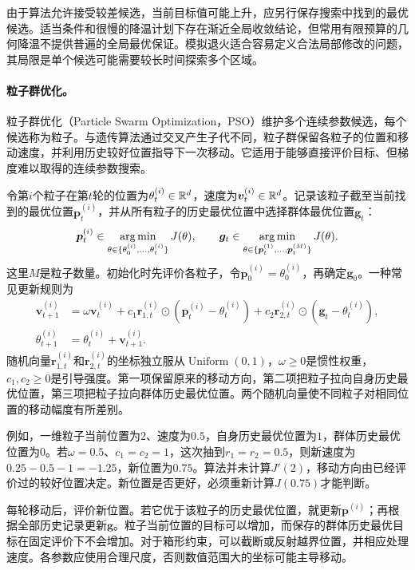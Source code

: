 由于算法允许接受较差候选，当前目标值可能上升，应另行保存搜索中找到的最优候选。适当条件和很慢的降温计划下存在渐近全局收敛结论，但常用有限预算的几何降温不提供普遍的全局最优保证。模拟退火适合容易定义合法局部修改的问题，其局限是单个候选可能需要较长时间探索多个区域。

\paragraph{粒子群优化。}
粒子群优化（Particle Swarm Optimization，PSO）维护多个连续参数候选，每个候选称为粒子。与遗传算法通过交叉产生子代不同，粒子群保留各粒子的位置和移动速度，并利用历史较好位置指导下一次移动。它适用于能够直接评价目标、但梯度难以取得的连续参数搜索。

令第$i$个粒子在第$t$轮的位置为$\theta_t^{(i)}\in\mathbb{R}^d$，速度为$\bm v_t^{(i)}\in\mathbb{R}^d$。记录该粒子截至当前找到的最优位置$\bm p_t^{(i)}$，并从所有粒子的历史最优位置中选择群体最优位置$\bm g_t$：
\begin{equation}
 \bm p_t^{(i)}\in\mathop{\mathrm{arg\,min}}_{\theta\in\{\theta_0^{(i)},\ldots,\theta_t^{(i)}\}}J(\theta),\qquad
 \bm g_t\in\mathop{\mathrm{arg\,min}}_{\theta\in\{\bm p_t^{(1)},\ldots,\bm p_t^{(M)}\}}J(\theta).
\end{equation}
这里$M$是粒子数量。初始化时先评价各粒子，令$\bm p_0^{(i)}=\theta_0^{(i)}$，再确定$\bm g_0$。一种常见更新规则为
\begin{align}
 \bm v_{t+1}^{(i)}
 &=\omega\bm v_t^{(i)}
 +c_1\bm r_{1,t}^{(i)}\odot(\bm p_t^{(i)}-\theta_t^{(i)})
 +c_2\bm r_{2,t}^{(i)}\odot(\bm g_t-\theta_t^{(i)}),\\
 \theta_{t+1}^{(i)}&=\theta_t^{(i)}+\bm v_{t+1}^{(i)}.
 \label{eq:solving-pso-update}
\end{align}
随机向量$\bm r_{1,t}^{(i)}$和$\bm r_{2,t}^{(i)}$的坐标独立服从$\operatorname{Uniform}(0,1)$，$\omega\geq0$是惯性权重，$c_1,c_2\geq0$是引导强度。第一项保留原来的移动方向，第二项把粒子拉向自身历史最优位置，第三项把粒子拉向群体历史最优位置。两个随机向量使不同粒子对相同位置的移动幅度有所差别。

例如，一维粒子当前位置为$2$、速度为$0.5$，自身历史最优位置为$1$，群体历史最优位置为$0$。若$\omega=0.5$、$c_1=c_2=1$，这次抽到$r_1=r_2=0.5$，则新速度为$0.25-0.5-1=-1.25$，新位置为$0.75$。算法并未计算$J'(2)$，移动方向由已经评价过的较好位置决定。新位置是否更好，必须重新计算$J(0.75)$才能判断。

每轮移动后，评价新位置。若它优于该粒子的历史最优位置，就更新$\bm p^{(i)}$；再根据全部历史记录更新$\bm g$。粒子当前位置的目标可以增加，而保存的群体历史最优目标在固定评价下不会增加。对于箱形约束，可以截断或反射越界位置，并相应处理速度。各参数应使用合理尺度，否则数值范围大的坐标可能主导移动。

